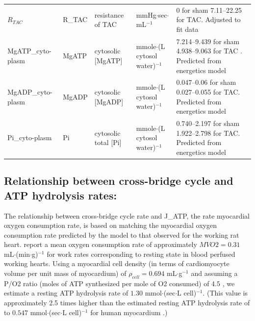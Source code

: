 \documentclass[fleqn,10pt]{physiome}
\begin{document}
\begin{table}[!htb]
\begin{supertabular}{p{1.8cm} p{1.4cm} p{3.0cm} p{1.8cm} p{3.6cm}}
$R_{TAC}$ & R\_TAC & resistance of TAC & mmHg$\cdot$sec$\cdot$ mL$^{-1}$  &  0 for sham
7.11--22.25 for TAC.
 Adjusted to fit data
 \\

MgATP\_cyto-plasm
 & MgATP & cytosolic [MgATP] & mmole$\cdot$(L cytosol water)$^{-1}$
 &  7.214--9.439 for sham
4.938--9.063 for TAC .
Predicted from energetics model 
 \\

MgADP\_cyto-plasm
  & MgADP & cytosolic [MgADP] & mmole$\cdot$(L cytosol water)$^{-1}$
  &  0.047--0.06 for sham
0.027--0.055 for TAC.
Predicted from energetics model 
 \\

Pi\_cyto-plasm
  & Pi & cytosolic total [Pi] & mmole$\cdot$(L cytosol water)$^{-1}$
 &  0.740--2.197 for sham
1.922--2.798 for TAC.
Predicted from energetics model \\

\bottomrule
\end{supertabular}
\end{table}

\subsection{Relationship between cross-bridge cycle and ATP hydrolysis rates:}

The relationship between cross-bridge cycle rate and J\_ATP, the rate myocardial oxygen consumption rate, is based on matching the myocardial oxygen consumption rate predicted by the model to that observed for the working rat heart. \cite{Duevelleroy1976} report a mean oxygen consumption rate of approximately $MVO2 = 0.31$ mL$\cdot$(min$\cdot$g)$^{-1}$ for work rates corresponding to resting state in blood perfused working hearts. Using a myocardial cell density (in terms of cardiomyocyte volume per unit mass of myocardium) of $\rho_{cell} = 0.694$ mL$\cdot$g$^{-1}$ and assuming a P/O2 ratio (moles of ATP synthesized per mole of O2 consumed) of 4.5 \cite{Wu2008}, we estimate a resting ATP hydrolysis rate of $1.30$ mmol$\cdot$(sec$\cdot$L cell)$^{-1}$. (This value is approximately 2.5 times higher than the estimated resting ATP hydrolysis rate of to $0.547$ mmol$\cdot$(sec$\cdot$L cell)$^{-1}$ for human myocardium \cite{Gao2019}.) 
\end{document}
